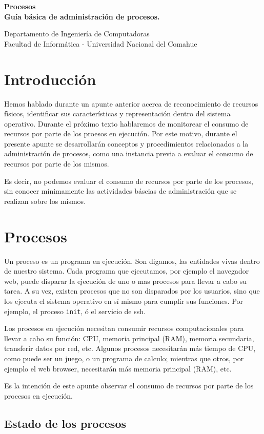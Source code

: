 \documentclass[12pt]{article}
\def\maketitle{

 \makeatletter
 {\color{bl} \centering \huge \sc \textbf{
 Procesos \\ 
\large \vspace*{-8pt} \color{black} Guía básica de administración de procesos. 
 \vspace*{8pt} }\par}
 \makeatother


 \makeatletter
 {\centering \small 
 	Departamento de Ingeniería de Computadoras \\
 	Facultad de Informática - Universidad Nacional del Comahue \\
 	\vspace{20pt} }
 \makeatother

}
\begin{document}
\thispagestyle{empty}
\maketitle
\setlength{\parindent}{0pt}

\section*{Introducción}

Hemos hablado durante un apunte anterior acerca de reconocimiento de 
recursos físicos, identificar sus características y representación dentro 
del sistema operativo. Durante el próximo texto hablaremos de 
monitorear el consumo de recursos por parte de los proesos en ejecución. 
Por este motivo, durante el presente apunte se desarrollarán conceptos y 
procedimientos relacionados a la administración de procesos, como una 
instancia previa a evaluar el consumo de recursos por parte de los mismos.

Es decir, no podemos evaluar el consumo de recursos por parte de los
procesos, sin conocer mínimamente las actividades báscias de administración
que se realizan sobre los mismos. 


\section*{Procesos}

Un proceso es un programa en ejecución. Son digamos, las entidades vivas 
dentro de nuestro sistema. Cada programa que ejecutamos, por ejemplo el 
navegador web, puede disparar la ejecución de uno o mas procesos para 
llevar a cabo su tarea.  A su vez, existen procesos que no son disparados 
por los usuarios, sino que los ejecuta el sistema operativo en sí mismo 
para cumplir sus funciones. Por ejemplo, el proceso \texttt{init}, ó el 
servicio de ssh. 

Los procesos en ejecución necesitan consumir recursos computacionales para 
llevar a cabo su función: CPU, memoria principal (RAM), memoria secundaria, 
transferir datos por red, etc. Algunos procesos necesitarán más tiempo de 
CPU, como puede ser un juego, o un programa de calculo; mientras que 
otros, por ejemplo el web browser, necesitarán más memoria principal 
(RAM), etc.

Es la intención de este apunte observar el consumo de recursos por parte de 
los procesos en ejecución. 
 
\subsection*{Estado de los procesos}
\end{document}
